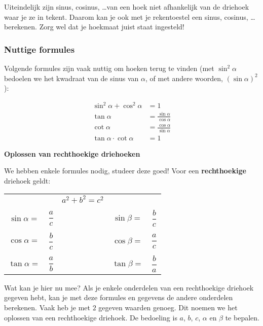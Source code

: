 Uiteindelijk zijn sinus, cosinus, \ldots van een hoek niet afhankelijk van de driehoek waar je ze in tekent. Daarom kan je ook met je rekentoestel een sinus, cosinus, \ldots berekenen. Zorg wel dat je hoekmaat juist staat ingesteld!

\subsubsection{Nuttige formules}

Volgende formules zijn vaak nuttig om hoeken terug te vinden (met $\sin^2 \alpha$ bedoelen we het kwadraat van de sinus van $\alpha$, of met andere woorden, $(\sin \alpha)^2$):

\begin{align*}
\sin^2 \alpha + \cos^2 \alpha &= 1\\
\tan \alpha &= \frac{\sin \alpha}{\cos \alpha}\\
\cot \alpha &= \frac{\cos \alpha}{\sin \alpha}\\
\tan \alpha\cdot \cot \alpha &= 1
\end{align*}

\textbf{Oplossen van rechthoekige driehoeken}


We hebben enkele formules nodig, studeer deze goed!  Voor een {\bf rechthoekige} driehoek geldt:

\begin{figure}[H]
	\centering 
	 
\end{figure}

\begin{center}
\begin{tabular}{ccccc}
&&$a^2+b^2=c^2$ &&\\
&&&&\\
$\sin \alpha=$ & $\dfrac{a}{c}$ &\qquad\qquad\qquad & $\sin \beta=$ & $\dfrac{b}{c}$\\
&&&&\\
$\cos \alpha=$ & $\dfrac{b}{c}$ &\qquad\qquad\qquad & $\cos \beta=$ & $\dfrac{a}{c}$\\
&&&&\\
$\tan \alpha=$ & $\dfrac{a}{b}$ &\qquad\qquad\qquad & $\tan \beta=$ & $\dfrac{b}{a}$\\
\end{tabular}
\end{center}

Wat kan je hier nu mee? Als je enkele onderdelen van een rechthoekige driehoek gegeven hebt, kan je met deze formules en gegevens de andere onderdelen berekenen. Vaak heb je met $2$ gegeven waarden genoeg. Dit noemen we het oplossen van een rechthoekige driehoek. De bedoeling is $a$, $b$, $c$, $\alpha$ en $\beta$ te bepalen.

